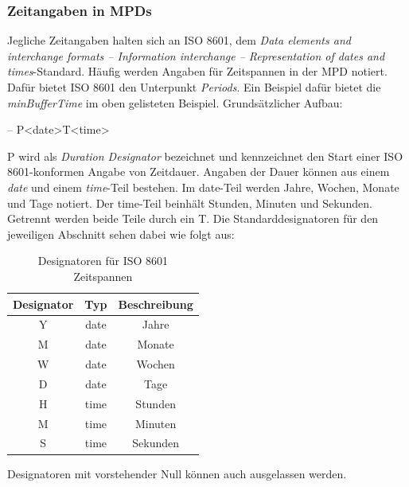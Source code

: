 \documentclass[paper = a4, fontsize = 12pt, parskip = half]{scrartcl} %
\begin{document}
\subsubsection{Zeitangaben in MPDs}
\label{iso8601_duration}
Jegliche Zeitangaben halten sich an ISO 8601, dem \textit{Data elements and interchange formats – Information interchange – Representation of dates and times}-Standard. Häufig werden Angaben für Zeitspannen in der MPD notiert. Dafür bietet ISO 8601 den Unterpunkt \textit{Periods}. Ein Beispiel dafür bietet die \textit{minBufferTime} im oben gelisteten Beispiel. Grundsätzlicher Aufbau:

-- P<date>T<time>

P wird als \textit{Duration Designator} bezeichnet und kennzeichnet den Start einer ISO 8601-konformen Angabe von Zeitdauer. Angaben der Dauer können aus einem \textit{date} und einem \textit{time}-Teil bestehen. Im date-Teil werden Jahre, Wochen, Monate und Tage notiert. Der time-Teil beinhält Stunden, Minuten und Sekunden. Getrennt werden beide Teile durch ein T. Die Standarddesignatoren für den jeweiligen Abschnitt sehen dabei wie folgt aus:

\begin{center}
    \begin{table}[ht]
        \label{iso_duration_designators}
        \centering
        \begin{tabular}{|c|c|c|}
            \hline
                \textbf{Designator} & \textbf{Typ} & \textbf{Beschreibung} \\
            \hline
            \hline
            Y & date & Jahre \\
            \hline
            M & date & Monate \\
            \hline
            W & date & Wochen \\
            \hline
            D & date & Tage \\
            \hline
            \hline
            H & time & Stunden \\
            \hline
            M & time & Minuten \\
            \hline
            S & time & Sekunden \\
            \hline
        \end{tabular}
        \caption{Designatoren für ISO 8601 Zeitspannen}
    \end{table}
\end{center}
Designatoren mit vorstehender Null können auch ausgelassen werden. 
\end{document}
